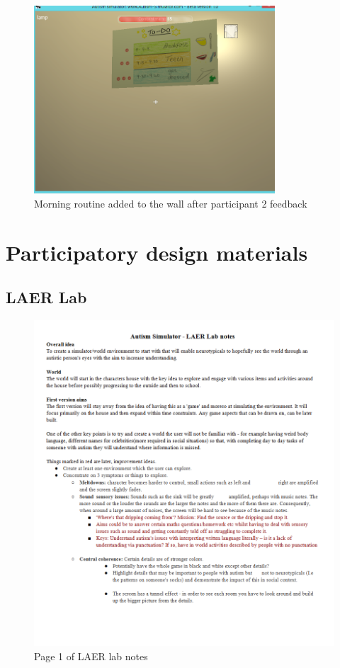 \begin{figure}[H]
\centering
\includegraphics[width=90mm]{images/implementationfirst/gameimages/morningroutine.png}
\caption{Morning routine added to the wall after participant 2 feedback}
\label{old_house}
\end{figure}

\chapter{Participatory design materials}
\label{appendix_partdesign}

\section{LAER Lab}
\begin{figure}[H]
\centering
\includegraphics[scale=0.7]{images/appendix/partdesign_laernotesa.png}
\caption{Page 1 of LAER lab notes}
\end{figure}

